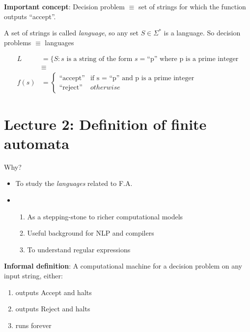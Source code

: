 \textbf{Important concept}: Decision problem $\equiv$ set of strings for which the function outputs ``accept''.

\begin{definition}
    A set of strings is called \emph{language}, so any set $S \in \Sigma^*$ is a language. So decision problems $\equiv$ languages
\end{definition}

\begin{equation*}
    \begin{aligned}
      L &= \{S: s \text{ is a string of the form } s=\text{``p'' where p is a prime integer} \\
      &\equiv \\
      f(s) &=
      \begin{cases}
        \text{``accept''} & \text{if s = ``p'' and p is a prime integer} \\
        \text{``reject''} & otherwise
      \end{cases}
    \end{aligned}
\end{equation*}

\section*{Lecture 2: Definition of finite automata}

Why?

\begin{itemize}
    \item To study the \emph{languages} related to F.A.
    \item
  \begin{enumerate}
    \item As a stepping-stone to richer computational models
    \item Useful background for NLP and compilers
    \item To understand regular expressions
  \end{enumerate}
\end{itemize}

\textbf{Informal definition}: A computational machine for a decision problem on any input string, either:

\begin{enumerate}
    \item outputs Accept and halts
    \item outputs Reject and halts
    \item runs forever
\end{enumerate}

